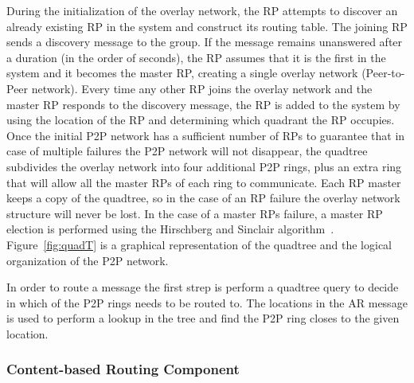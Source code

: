 During the initialization of the overlay network, the RP attempts to discover an already existing RP in the system and construct its routing table. The joining RP sends a discovery message to the group. If the message remains unanswered after a duration (in the order of seconds), the RP assumes that it is the first in the system and it becomes the master RP, creating a single overlay network (Peer-to-Peer network). Every time any other RP joins the overlay network and the master RP responds to the discovery message, the  RP is added to the system by using the location of the RP and determining which quadrant the RP occupies. Once the initial P2P network has a sufficient number of RPs to guarantee that in case of multiple failures the P2P network will not disappear, the quadtree subdivides the overlay network into four additional P2P rings, plus an extra ring that will allow all the master RPs of each ring to communicate. Each RP master keeps a copy of the quadtree, so in the case of an RP failure the overlay network structure will never be lost. In the case of a master RPs failure, a master RP election is performed using the Hirschberg and Sinclair algorithm~\cite{Hirschberg}. Figure~\ref{fig:quadT} is a graphical representation of the quadtree and the logical organization of the P2P network.

In order to route a message the first strep is perform a quadtree query to decide in which of the P2P rings needs to be routed to. The locations in the AR message is used to perform a lookup in the tree and find the P2P ring closes to the given location. 

\subsubsection{Content-based Routing Component}\label{sec:frameworkc}

